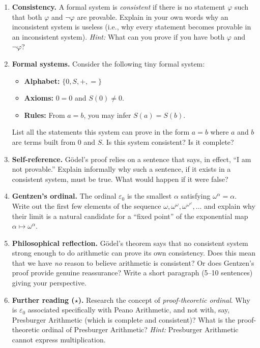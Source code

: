 \begin{enumerate}

    \item \textbf{Consistency.} A formal system is \emph{consistent} if there is no statement $\varphi$ such that both $\varphi$ and $\neg\varphi$ are provable. Explain in your own words why an inconsistent system is useless (i.e., why every statement becomes provable in an inconsistent system). \emph{Hint:} What can you prove if you have both $\varphi$ and $\neg\varphi$?

    \item \textbf{Formal systems.} Consider the following tiny formal system:
    \begin{itemize}
        \item \textbf{Alphabet:} $\{0, S, +, =\}$
        \item \textbf{Axioms:} $0 = 0$ and $S(0) \neq 0$.
        \item \textbf{Rules:} From $a = b$, you may infer $S(a) = S(b)$.
    \end{itemize}
    List all the statements this system can prove in the form $a = b$ where $a$ and $b$ are terms built from $0$ and $S$. Is this system consistent? Is it complete?

    \item \textbf{Self-reference.} G\"odel's proof relies on a sentence that says, in effect, ``I am not provable.'' Explain informally why such a sentence, if it exists in a consistent system, must be true. What would happen if it were false?

    \item \textbf{Gentzen's ordinal.} The ordinal $\varepsilon_0$ is the smallest $\alpha$ satisfying $\omega^\alpha = \alpha$. Write out the first few elements of the sequence $\omega, \omega^\omega, \omega^{\omega^\omega}, \ldots$ and explain why their limit is a natural candidate for a ``fixed point'' of the exponential map $\alpha \mapsto \omega^\alpha$.

    \item \textbf{Philosophical reflection.} G\"odel's theorem says that no consistent system strong enough to do arithmetic can prove its own consistency. Does this mean that we have \emph{no} reason to believe arithmetic is consistent? Or does Gentzen's proof provide genuine reassurance? Write a short paragraph (5--10 sentences) giving your perspective.

    \item \textbf{Further reading ($\star$).} Research the concept of \emph{proof-theoretic ordinal}. Why is $\varepsilon_0$ associated specifically with Peano Arithmetic, and not with, say, Presburger Arithmetic (which is complete and consistent)? What is the proof-theoretic ordinal of Presburger Arithmetic? \emph{Hint:} Presburger Arithmetic cannot express multiplication.

\end{enumerate}
